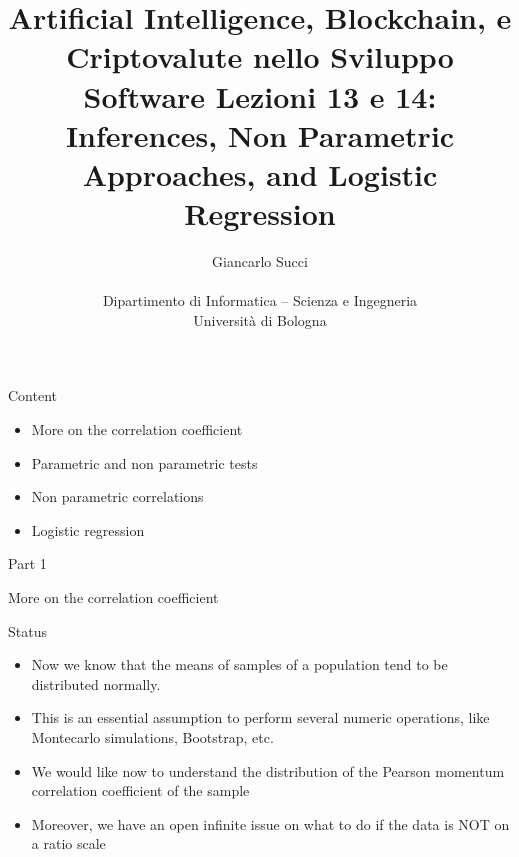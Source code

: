 \documentclass{beamer}
\title[L01]{Artificial Intelligence, Blockchain, e Criptovalute nello Sviluppo Software \newline\newline
Lezioni 13 e 14: Inferences, Non Parametric Approaches, and Logistic Regression} %
\author[{\tiny Giancarlo Succi }]{Giancarlo Succi\\\\ Dipartimento di Informatica -- Scienza e Ingegneria\\Universit\`{a} di Bologna\\
\bftt{g.succi@unibo.it}
} %
\institute[unibo] %
\date{} %
\begin{document}
\begin{frame}
\titlepage %

\end{frame}



\begin{frame}
{\centerline{Content}}

\begin{itemize}
\item More on the correlation coefficient
\item Parametric and non parametric tests
\item Non parametric correlations
\item Logistic regression
\end{itemize}
\end{frame}


\begin{frame}
{\centerline{Part 1}}

\begin{center}
\Huge More on the correlation coefficient
\end{center}
\end{frame}


\begin{frame}
{\centerline{Status}}

\begin{itemize}
\item Now we know that the means of samples of a population tend to be distributed normally.
\item This is an essential assumption to perform several numeric operations, like Montecarlo simulations, Bootstrap, etc.
\item We would like now to understand the distribution of the Pearson momentum correlation coefficient of the sample
\item Moreover, we have an open infinite issue on what to do if the data is NOT on a ratio scale
\end{itemize}


\end{frame}
\end{document}
